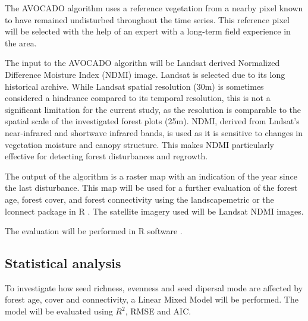 The AVOCADO algorithm uses a reference vegetation from a nearby pixel known to have remained undisturbed throughout the time series. This reference pixel will be selected with the help of an expert with a long-term field experience in the area. 

The input to the AVOCADO algorithn will be Landsat derived Normalized Difference Moisture Index (NDMI) image. Landsat is selected due to its long historical archive. While Landsat spatial resolution (30m) is sometimes considered a hindrance compared to its temporal resolution, this is not a significant limitation for the current study, as the resolution is comparable to the spatial scale of the investigated forest plots (25m). NDMI, derived from Lndsat's near-infrared and shortwave infrared bands, is used as it is sensitive to changes in vegetation moisture and canopy structure. This makes NDMI particularly effective for detecting forest disturbances and regrowth.

The output of the algorithm is a raster map with an indication of the year since the last disturbance. This map will be used for a further evaluation of the forest age, forest cover, and forest connectivity using the landscapemetric or the lconnect package in R \citep{mestreLconnectPackageVersatile2023, hesselbarthLandscapemetricsOpensourceTool2019}. The satellite imagery used will be Landsat NDMI images. 

The evaluation will be performed in R software \citep{R}.

\subsection{Statistical analysis}
To investigate how seed richness, evenness and seed dipersal mode are affected by forest age, cover and connectivity, a Linear Mixed Model will be performed. The model will be evaluated using $R^2$, RMSE and AIC.

 